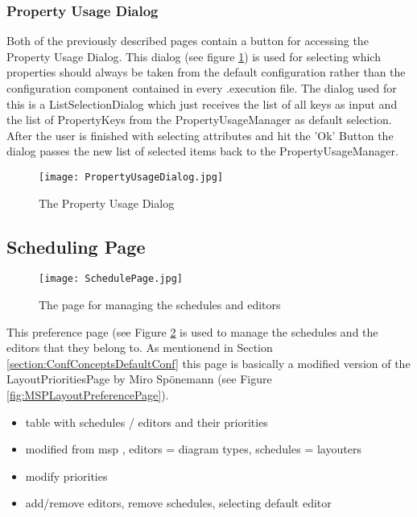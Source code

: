 \subsubsection{Property Usage Dialog}
Both of the previously described pages contain a button for accessing the Property Usage Dialog.
This dialog (see figure \ref{fig:PropertyUsageDialog}) is used for selecting which properties should always be taken
from the default configuration rather than the configuration component contained in every .execution file.
The dialog used for this is a ListSelectionDialog which just receives the list of
all keys as input and the list of PropertyKeys from the PropertyUsageManager as default selection.
After the user is finished with selecting attributes and hit the 'Ok' Button the dialog
passes the new list of selected items back to the PropertyUsageManager.
\begin{figure}[PropertyUsageDialog]
  \centering
  \texttt{[image: PropertyUsageDialog.jpg]}
  \caption[Property Usage Dialog]%
  {The Property Usage Dialog\protect}
  \label{fig:PropertyUsageDialog}
\end{figure}

\subsection{Scheduling Page}
\label{section:SchedulingPage}
\begin{figure}[Scheduling Page]
  \centering
  \texttt{[image: SchedulePage.jpg]}
  \caption[The page for managing the schedules and editors]%
  {The page for managing the schedules and editors\protect}
  \label{fig:SchedulePage}
\end{figure}
This preference page (see Figure \ref{fig:SchedulePage} is used to manage the schedules and the editors that they belong to.
As mentionend in Section \ref{section:ConfConceptsDefaultConf} this page is basically a modified version 
of the LayoutPrioritiesPage by Miro Sp\"onemann (see Figure \ref{fig:MSPLayoutPreferencePage}).

\begin{itemize}
 \item table with schedules / editors and their priorities
 \item modified from msp , editors = diagram types, schedules = layouters
 \item modify priorities
 \item add/remove editors, remove schedules, selecting default editor
\end{itemize}

